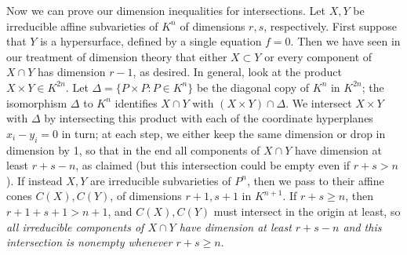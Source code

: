 Now we can prove our dimension inequalities for intersections.  Let $X,Y$ be irreducible affine subvarieties of $K^n$ of dimensions $r,s$, respectively.  First suppose that $Y$ is a hypersurface, defined by a single equation $f=0$.  Then we have seen in our treatment of dimension theory that either $X\subset Y$ or every component of $X\cap Y$ has dimension $r-1$, as desired.  In general, look at the product $X\times Y\in K^{2n}$.  Let $\Delta = \{P\times P: P\in K^n\}$ be the diagonal copy of $K^n$ in $K^{2n}$; the isomorphism $\Delta$ to $K^n$ identifies $X\cap Y$ with
$(X\times Y)\cap\Delta$.  We intersect $X\times Y$ with $\Delta$ by intersecting this product with each of the coordinate hyperplanes $x_i - y_i = 0$ in turn; at each step, we either keep the same dimension or drop in dimension by 1, so that in the end all components of $X\cap Y$ have dimension at least $r+s-n$, as claimed (but this intersection could be empty even if $r+s>n$).  If instead $X,Y$ are irreducible subvarieties of $P^n$, then we pass to their affine cones $C(X),C(Y)$, of dimensions $r+1,s+1$ in $K^{n+1}$.  If $r+s\ge n$, then $r+1+s+1>n+1$, and $C(X),C(Y)$ must intersect in the origin at least, so {\sl all irreducible components of $X\cap Y$ have dimension at least $r+s-n$ and this intersection is nonempty whenever $r+s\ge n$}.

